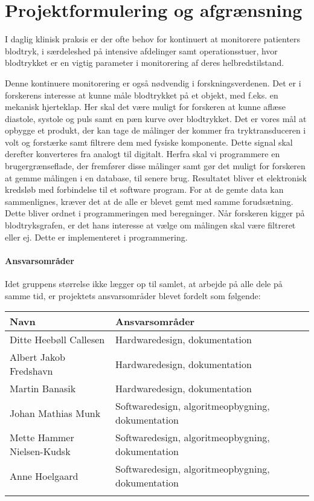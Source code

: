 \chapter{Projektformulering og afgrænsning}
I daglig klinisk praksis er der ofte behov for kontinuert at monitorere patienters blodtryk, i særdeleshed på intensive afdelinger samt operationsstuer, hvor blodtrykket er en vigtig parameter i monitorering af deres helbredstilstand.

Denne kontinuere monitorering er også nødvendig i forskningsverdenen. Det er i forskerens interesse at kunne måle blodtrykket på et objekt, med f.eks. en mekanisk hjerteklap. Her skal det være muligt for forskeren at kunne aflæse diastole, systole og puls samt en pæn kurve over blodtrykket. Det er vores mål at opbygge et produkt, der kan tage de målinger der kommer fra tryktransduceren i volt og forstærke samt filtrere dem med fysiske komponente. Dette signal skal derefter konverteres fra analogt til digitalt. Herfra skal vi programmere en brugergrænseflade, der fremfører disse målinger samt gør det muligt for forskeren at gemme målingen i en database, til senere brug. Resultatet bliver et elektronisk kredsløb med forbindelse til et software program.
For at de gemte data kan sammenlignes, kræver det at de alle er blevet gemt med samme forudsætning. Dette bliver ordnet i programmeringen med beregninger. Når forskeren kigger på blodtryksgrafen, er det hans interesse at vælge om målingen skal være filtreret eller ej. Dette er implementeret i programmering. 
\subsubsection{Ansvarsområder}

Idet gruppens størrelse ikke lægger op til samlet, at arbejde på alle dele på samme tid, er projektets ansvarsområder blevet fordelt som følgende:

\begin{longtabu} to 
    Navn &    Ansvarsområder &    \\[-1ex]
    \midrule
    Ditte Heebøll Callesen &   Hardwaredesign, dokumentation	&    \\
    Albert Jakob Fredshavn &   Hardwaredesign, dokumentation	&    \\
    Martin Banasik         &   Hardwaredesign, dokumentation	&    \\
    Johan Mathias Munk     &   Softwaredesign, algoritmeopbygning, dokumentation &    \\
    Mette Hammer Nielsen-Kudsk  &   Softwaredesign, algoritmeopbygning, dokumentation	&    \\
   	Anne Hoelgaard    &   Softwaredesign, algoritmeopbygning, dokumentation	&    \\
\label{version_Systemark}
\end{longtabu}